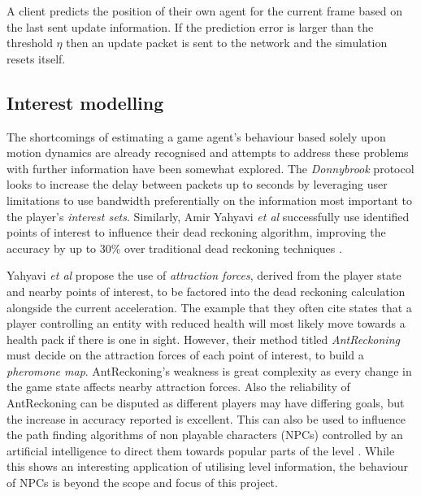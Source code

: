 \documentclass[journal]{IEEEtran}
\begin{document}
\begin{algorithm}
\DontPrintSemicolon %
\caption{A client predicts the position of their own agent for the current frame based on the last sent update information. If the prediction error is larger than the threshold ${\eta}$ then an update packet is sent to the network and the simulation resets itself.}
\label{algo:pseudo}
\end{algorithm}

\subsection{Interest modelling} \label{interestModelling}

The shortcomings of estimating a game agent's behaviour based solely upon motion dynamics are already recognised and attempts to address these problems with further information have been somewhat explored. The \textit{Donnybrook} protocol \cite{bharambe2008donnybrook} looks to increase the delay between packets up to seconds by leveraging user limitations to use bandwidth preferentially on the information most important to the player's \textit{interest sets}. Similarly, Amir Yahyavi \textit{et al} successfully use identified points of interest to influence their dead reckoning algorithm, improving the accuracy by up to 30\% over traditional dead reckoning techniques \cite{yahyavi2011antreckoning}.

Yahyavi \textit{et al} propose the use of \textit{attraction forces}, derived from the player state and nearby points of interest, to be factored into the dead reckoning calculation alongside the current acceleration. The example that they often cite states that a player controlling an entity with reduced health will most likely move towards a health pack if there is one in sight. However, their method titled \textit{AntReckoning} must decide on the attraction forces of each point of interest, to build a \textit{pheromone map}. AntReckoning's weakness is great complexity as every change in the game state affects nearby attraction forces. Also the reliability of AntReckoning can be disputed as different players may have differing goals, but the increase in accuracy reported is excellent. This can also be used to influence the path finding algorithms of non playable characters (NPCs) controlled by an artificial intelligence to direct them towards popular parts of the level \cite{yahyavi2013interest} \cite{yahyavi2013towards}. While this shows an interesting application of utilising level information, the behaviour of NPCs is beyond the scope and focus of this project.
\end{document}
